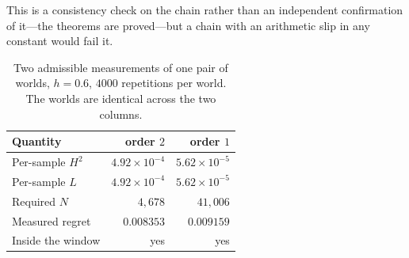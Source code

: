 This is a consistency check on the chain rather than an independent confirmation of it---the
theorems are proved---but a chain with an arithmetic slip in any constant would fail it.

\begin{table}[htbp]
\caption{Two admissible measurements of one pair of worlds, $h=0.6$, $4000$ repetitions per
world. The worlds are identical across the two columns.}
\label{tab:qy-query}
\centering
\footnotesize
\begin{tabular}{@{}lrr@{}}
\toprule
Quantity & order $2$ & order $1$ \\
\midrule
Per-sample $H^{2}$      & $4.92\times10^{-4}$ & $5.62\times10^{-5}$ \\
Per-sample $L$          & $4.92\times10^{-4}$ & $5.62\times10^{-5}$ \\
Required $N$            & $4{,}678$           & $41{,}006$ \\
Measured regret         & $0.008353$          & $0.009159$ \\
Inside the window       & yes                 & yes \\
\bottomrule
\end{tabular}
\end{table}

